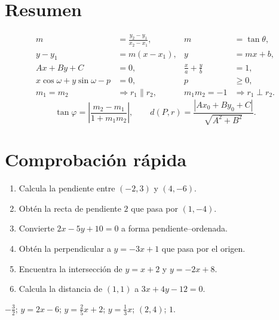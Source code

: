 \clearpage
\section*{Resumen}

\begin{properties}
\[
\begin{aligned}
m&=\frac{y_2-y_1}{x_2-x_1},
&m&=\tan\theta,\\[1mm]
y-y_1&=m(x-x_1),
&y&=mx+b,\\[1mm]
Ax+By+C&=0,
&\frac xa+\frac yb&=1,\\[1mm]
x\cos\omega+y\sin\omega-p&=0,
&p&\geq0,\\[1mm]
m_1=m_2&\Longrightarrow r_1\parallel r_2,
&m_1m_2=-1&\Longrightarrow r_1\perp r_2.
\end{aligned}
\]
\[
\tan\varphi=\left|\frac{m_2-m_1}{1+m_1m_2}\right|,
\qquad
d(P,r)=\frac{|Ax_0+By_0+C|}{\sqrt{A^2+B^2}}.
\]
\end{properties}

\section*{Comprobación rápida}

\begin{enumerate}
  \item Calcula la pendiente entre $(-2,3)$ y $(4,-6)$.
  \item Obtén la recta de pendiente $2$ que pasa por $(1,-4)$.
  \item Convierte $2x-5y+10=0$ a forma pendiente--ordenada.
  \item Obtén la perpendicular a $y=-3x+1$ que pasa por el origen.
  \item Encuentra la intersección de $y=x+2$ y $y=-2x+8$.
  \item Calcula la distancia de $(1,1)$ a $3x+4y-12=0$.
\end{enumerate}

\begin{hints}[title={Resultados}]
$-\frac32$; \quad $y=2x-6$; \quad $y=\frac25x+2$; \quad
$y=\frac13x$; \quad $(2,4)$; \quad $1$.
\end{hints}
